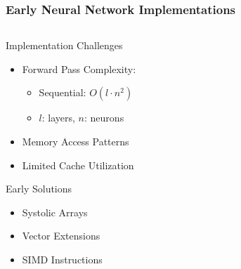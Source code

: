 \documentclass[aspectratio=169,t,xcolor=table]{beamer}
\begin{document}
\begin{frame}
    \frametitle{Early Neural Network Implementations}
    
    \begin{columns}[t]
        \begin{column}{0.5\textwidth}
            \begin{block}{Implementation Challenges}
                \small
                \begin{itemize}\setlength{\itemsep}{0pt}
                    \item Forward Pass Complexity:
                        \begin{itemize}
                            \item Sequential: $O(l \cdot n^2)$
                            \item $l$: layers, $n$: neurons
                        \end{itemize}
                    \item Memory Access Patterns
                    \item Limited Cache Utilization
                \end{itemize}
            \end{block}
            
            \begin{alertblock}{Early Solutions}
                \small
                \begin{itemize}\setlength{\itemsep}{0pt}
                    \item Systolic Arrays
                    \item Vector Extensions
                    \item SIMD Instructions
                \end{itemize}
            \end{alertblock}
        \end{column}
        
        \begin{column}{0.45\textwidth}
\end{column}
\end{columns}
\end{frame}
\end{document}
